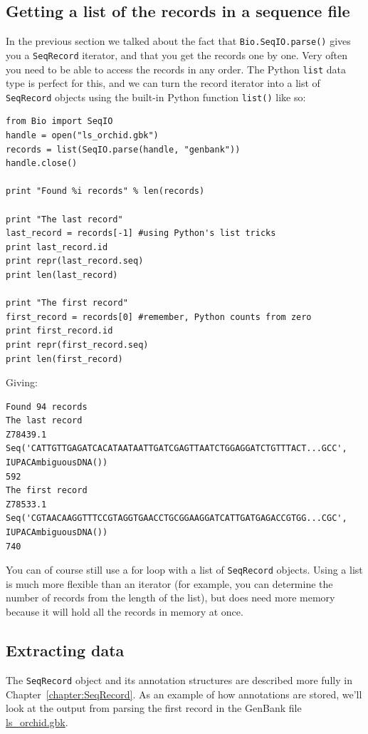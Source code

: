 \documentclass{report}
\begin{document}
\subsection{Getting a list of the records in a sequence file}

In the previous section we talked about the fact that \verb|Bio.SeqIO.parse()| gives you a \verb|SeqRecord| iterator, and that you get the records one by one.  Very often you need to be able to access the records in any order. The Python \verb|list| data type is perfect for this, and we can turn the record iterator into a list of \verb|SeqRecord| objects using the built-in Python function \verb|list()| like so:

\begin{verbatim}
from Bio import SeqIO
handle = open("ls_orchid.gbk")
records = list(SeqIO.parse(handle, "genbank"))
handle.close()

print "Found %i records" % len(records)

print "The last record"
last_record = records[-1] #using Python's list tricks
print last_record.id
print repr(last_record.seq)
print len(last_record)

print "The first record"
first_record = records[0] #remember, Python counts from zero
print first_record.id
print repr(first_record.seq)
print len(first_record)
\end{verbatim}

\noindent Giving:

\begin{verbatim}
Found 94 records
The last record
Z78439.1
Seq('CATTGTTGAGATCACATAATAATTGATCGAGTTAATCTGGAGGATCTGTTTACT...GCC', IUPACAmbiguousDNA())
592
The first record
Z78533.1
Seq('CGTAACAAGGTTTCCGTAGGTGAACCTGCGGAAGGATCATTGATGAGACCGTGG...CGC', IUPACAmbiguousDNA())
740
\end{verbatim}

You can of course still use a for loop with a list of \verb|SeqRecord| objects.  Using a list is much more flexible than an iterator (for example, you can determine the number of records from the length of the list), but does need more memory because it will hold all the records in memory at once.

\subsection{Extracting data}

The \verb|SeqRecord| object and its annotation structures are described more fully in
Chapter~\ref{chapter:SeqRecord}.  As an example of how annotations are stored, we'll look at the output from parsing the first record in the GenBank file \href{http://biopython.org/DIST/docs/tutorial/examples/ls_orchid.gbk}{ls\_orchid.gbk}.
\end{document}
